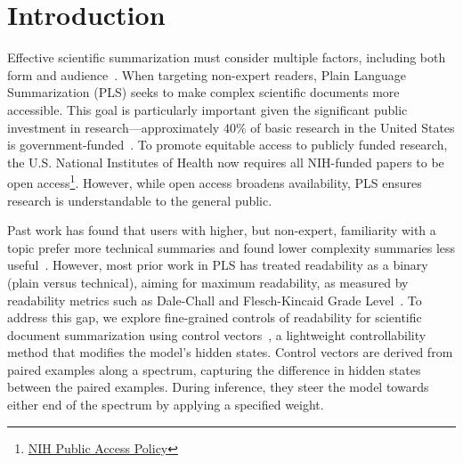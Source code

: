 

\section{Introduction}


Effective scientific summarization must consider multiple factors, including both form and audience~\cite{cohan-etal-2022-overview-first,ScisummNet.v33i01.33017386,BioLaySumm_2024}. When targeting non-expert readers, Plain Language Summarization (PLS) seeks to make complex scientific documents more accessible. This goal is particularly important given the significant public investment in research—approximately 40\% of basic research in the United States is government-funded~\cite{Pece_Anderson_2024}. To promote equitable access to publicly funded research, the U.S. National Institutes of Health now requires all NIH-funded papers to be open access\footnote{\href{https://grants.nih.gov/policy-and-compliance/policy-topics/public-access/nih-public-access-policy-overview}{NIH
 Public Access Policy}}. However, while open access broadens availability, PLS ensures research is understandable to the general public.


Past work has found that users with higher, but non-expert, familiarity with a topic prefer more technical summaries and found lower complexity summaries less useful~\cite{August2024KnowYA}. However, most prior work in PLS has treated readability as a binary (plain versus technical), aiming for maximum readability, as measured by readability metrics such as Dale-Chall and Flesch-Kincaid Grade Level~\cite{Guo2020AutomatedLL,goldsack2022making,dale1948formula,tanprasert-kauchak-2021-flesch}. To address this gap, we explore fine-grained controls of readability for scientific document summarization using control vectors~\cite{zou2025representationengineeringtopdownapproach, rimsky-etal-2024-steering}, a lightweight controllability method that modifies the model's hidden states. Control vectors are derived from paired examples along a spectrum, capturing the difference in hidden states between the paired examples. During inference, they steer the model towards either end of the spectrum by applying a specified weight. 


